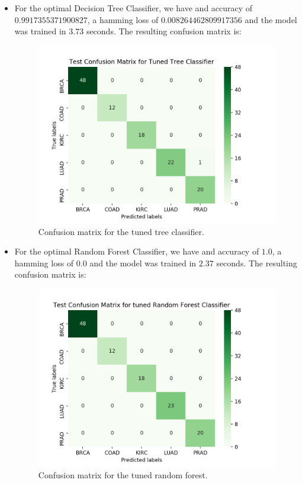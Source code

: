 \documentclass{article}
\begin{document}
\begin{itemize}
\item For the optimal Decision Tree Classifier, we have and accuracy of $0.9917355371900827 $, a hamming loss of $0.008264462809917356 $ and the model was trained in $3.73$ seconds.
The resulting confusion matrix is:

\begin{figure}[h!]
\centering
\includegraphics[width=\linewidth]{img/matrix_tree}
\caption{Confusion matrix for the tuned tree classifier.}
\label{mat_tree}
\end{figure}

\item For the optimal Random Forest Classifier, we have and accuracy of $1.0 $, a hamming loss of $0.0$ and the model was trained in $2.37$ seconds. The resulting confusion matrix is:

\begin{figure}[h!]
\centering
\includegraphics[width=\linewidth]{img/matrix_forest}
\caption{Confusion matrix for the tuned random forest.}
\label{mat_forest}
\end{figure}


\end{itemize}
\end{document}
